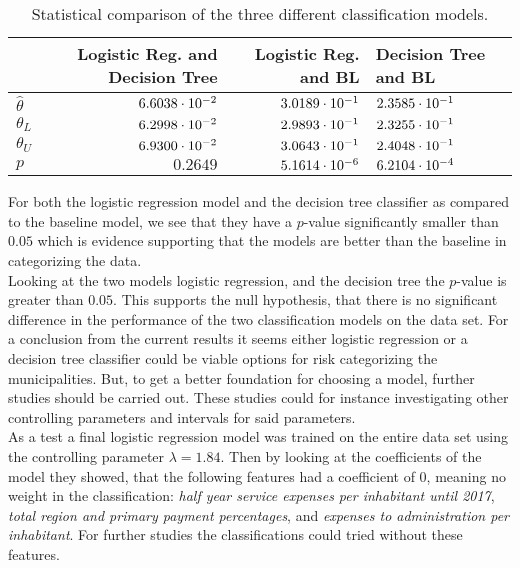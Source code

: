 \begin{table}[H]
	\centering
	\begin{tabular}{l r r l}
		&Logistic Reg. and Decision Tree	&Logistic Reg. and BL&Decision Tree and BL	\\\hline
		$ \hat{\theta} $	& $6.6038\cdot10^{-2}$	& $3.0189\cdot10^{-1}$	&$2.3585\cdot10^{-1}$\\
		$ \theta_{L} $		&$ 6.2998\cdot10^{-2}$ 	& $2.9893\cdot10^{-1}$	&$ 2.3255\cdot10^{-1}$\\
		$ \theta_{U} $		&$ 6.9300\cdot10^{-2}$  & $3.0643\cdot10^{-1}$	&$ 2.4048\cdot10^{-1} $\\
		$ p $ 				&$ 0.2649 $  		&$5.1614\cdot10^{-6} $	&$6.2104\cdot10^{-4} $
	\end{tabular}
	\caption{Statistical comparison of the three different classification models.}\label{tab:logi_McNemar}
\end{table}\noindent
For both the logistic regression model and the decision tree classifier as compared to the baseline model, we see that they have a $p$-value significantly smaller than $0.05$ which is evidence supporting that the models are better than the baseline in categorizing the data.
\\
Looking at the two models logistic regression, and the decision tree the $p$-value is greater than $0.05$. This supports the null hypothesis, that there is no significant difference in the performance of the two classification models on the data set. For a conclusion from the current results it seems either logistic regression or a decision tree classifier could be viable options for risk categorizing the municipalities. But, to get a better foundation for choosing a model, further studies should be carried out. These studies could for instance investigating other controlling parameters and intervals for said parameters.
\\
As a test a final logistic regression model was trained on the entire data set using the controlling parameter $\lambda = 1.84$. Then by looking at the coefficients of the model they showed, that the following features had a coefficient of 0, meaning no weight in the classification: \textit{half year service expenses per inhabitant until 2017}, \textit{total region and primary payment percentages}, and \textit{expenses to administration per inhabitant}. For further studies the classifications could tried without these features.

\clearpage